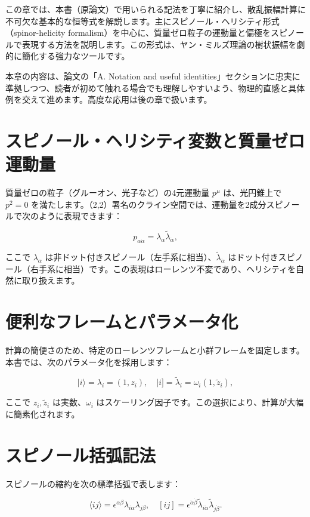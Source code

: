 \documentclass[dvipdfmx,a4paper]{jsbook}
\theoremstyle{definition}
\theoremstyle{remark}
\begin{document}
この章では、本書（原論文）で用いられる記法を丁寧に紹介し、散乱振幅計算に不可欠な基本的な恒等式を解説します。主にスピノール・ヘリシティ形式（spinor-helicity formalism）を中心に、質量ゼロ粒子の運動量と偏極をスピノールで表現する方法を説明します。この形式は、ヤン・ミルズ理論の樹状振幅を劇的に簡化する強力なツールです。

本章の内容は、論文の「A. Notation and useful identities」セクションに忠実に準拠しつつ、読者が初めて触れる場合でも理解しやすいよう、物理的直感と具体例を交えて進めます。高度な応用は後の章で扱います。

\section{スピノール・ヘリシティ変数と質量ゼロ運動量}

質量ゼロの粒子（グルーオン、光子など）の4元運動量 \(p^\mu\) は、光円錐上で \(p^2 = 0\) を満たします。（2,2）署名のクライン空間では、運動量を2成分スピノールで次のように表現できます：

\[
p_{\alpha \dot{\alpha}} = \lambda_\alpha \tilde{\lambda}_{\dot{\alpha}},
\]

ここで \(\lambda_\alpha\) は非ドット付きスピノール（左手系に相当）、\(\tilde{\lambda}_{\dot{\alpha}}\) はドット付きスピノール（右手系に相当）です。この表現はローレンツ不変であり、ヘリシティを自然に取り扱えます。

\section{便利なフレームとパラメータ化}

計算の簡便さのため、特定のローレンツフレームと小群フレームを固定します。本書では、次のパラメータ化を採用します：

\[
|i\rangle = \lambda_i = (1, z_i), \quad |i] = \tilde{\lambda}_i = \omega_i (1, \tilde{z}_i),
\]

ここで \(z_i, \tilde{z}_i\) は実数、\(\omega_i\) はスケーリング因子です。この選択により、計算が大幅に簡素化されます。

\section{スピノール括弧記法}

スピノールの縮約を次の標準括弧で表します：

\[
\langle ij \rangle = \epsilon^{\alpha\beta} \lambda_{i\alpha} \lambda_{j\beta}, \quad [ij] = \epsilon^{\dot{\alpha}\dot{\beta}} \tilde{\lambda}_{i\dot{\alpha}} \tilde{\lambda}_{j\dot{\beta}}.
\]
\end{document}
